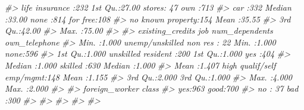 \documentclass[]{article}
\newenvironment{Shaded}{\begin{snugshade}}{\end{snugshade}}
\newcommand{\CommentTok}[1]{\textcolor[rgb]{0.56,0.35,0.01}{\textit{#1}}}
\begin{document}
\begin{Shaded}
\begin{Highlighting}[]
\CommentTok{#>  life insurance   :232      1st Qu.:27.00   stores: 47          own     :713  }
\CommentTok{#>  car              :332      Median :33.00   none  :814          for free:108  }
\CommentTok{#>  no known property:154      Mean   :35.55                                     }
\CommentTok{#>                             3rd Qu.:42.00                                     }
\CommentTok{#>                             Max.   :75.00                                     }
\CommentTok{#>                                                                               }
\CommentTok{#>  existing_credits                        job      num_dependents  own_telephone}
\CommentTok{#>  Min.   :1.000    unemp/unskilled non res  : 22   Min.   :1.000   none:596     }
\CommentTok{#>  1st Qu.:1.000    unskilled resident       :200   1st Qu.:1.000   yes :404     }
\CommentTok{#>  Median :1.000    skilled                  :630   Median :1.000                }
\CommentTok{#>  Mean   :1.407    high qualif/self emp/mgmt:148   Mean   :1.155                }
\CommentTok{#>  3rd Qu.:2.000                                    3rd Qu.:1.000                }
\CommentTok{#>  Max.   :4.000                                    Max.   :2.000                }
\CommentTok{#>                                                                                }
\CommentTok{#>  foreign_worker  class    }
\CommentTok{#>  yes:963        good:700  }
\CommentTok{#>  no : 37        bad :300  }
\CommentTok{#>                           }
\CommentTok{#>                           }
\CommentTok{#>                           }
\CommentTok{#>                           }
\CommentTok{#> }
\end{Highlighting}
\end{Shaded}
\end{document}
